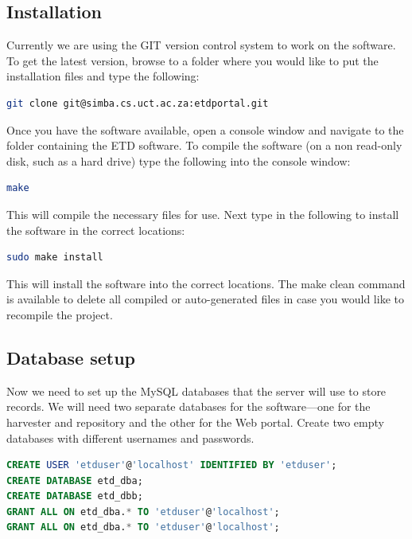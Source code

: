 \documentclass[a4paper,11pt]{article}
\begin{document}
\subsection{Installation}
\label{sec:installation_process:installation}

Currently we are using the GIT version control system to work on the software. To get the latest version, browse to a folder where you would like to put the installation files and type the following:

\begin{lstlisting}[language=bash]
git clone git@simba.cs.uct.ac.za:etdportal.git 
\end{lstlisting}

Once you have the software available, open a console window and navigate to the folder containing the ETD software. To compile the software (on a non read-only disk, such as a hard drive) type the following into the console window: 

\begin{lstlisting}[language=bash]
make
\end{lstlisting}

This will compile the necessary files for use. Next type in the following to install the software in the correct locations: 

\begin{lstlisting}[language=bash]
sudo make install
\end{lstlisting}

This will install the software into the correct locations. The make clean command is available to delete all compiled or auto-generated files in case you would like to recompile the project.

\subsection{Database setup}
\label{sec:installation_process:database_setup}

Now we need to set up the MySQL databases that the server will use to store records. We will need two separate databases for the software---one for the harvester and repository and the other for the Web portal. Create two empty databases with different usernames and passwords. 

\begin{lstlisting}[language=SQL]
CREATE USER 'etduser'@'localhost' IDENTIFIED BY 'etduser'; 
CREATE DATABASE etd_dba; 
CREATE DATABASE etd_dbb; 
GRANT ALL ON etd_dba.* TO 'etduser'@'localhost';
GRANT ALL ON etd_dba.* TO 'etduser'@'localhost';
\end{lstlisting}
\end{document}

